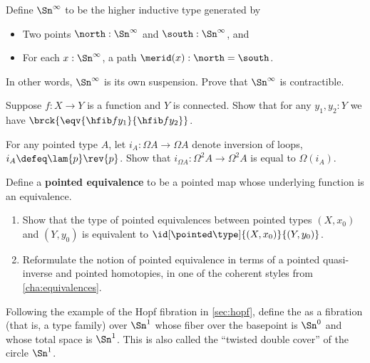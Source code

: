 {\begin{ex}\label{ex:contr-infinity-sphere-susp}
  Define $\Sn^\infty$ to be the higher inductive type generated by
  \begin{itemize}
  \item Two points $\north:\Sn^\infty$ and $\south:\Sn^\infty$, and
  \item For each $x:\Sn^\infty$, a path $\merid(x):\north=\south$.
  \end{itemize}
  In other words, $\Sn^\infty$ is its own suspension.
  Prove that $\Sn^\infty$ is contractible.
\end{ex}

\begin{ex}\label{ex:unique-fiber}
  Suppose $f:X\to Y$ is a function and $Y$ is connected.
  Show that for any $y_1,y_2:Y$ we have $\brck{\eqv{\hfib f {y_1}}{\hfib f {y_2}}}$.
\end{ex}

\begin{ex}\label{ex:ap-path-inversion}
  For any pointed type $A$, let $i_A : \Omega A \to \Omega A$ denote inversion of loops, $i_A \defeq \lam{p} \rev{p}$.
  Show that $i_{\Omega A} : \Omega^2 A \to \Omega^2 A$ is equal to $\Omega(i_A)$.
\end{ex}

\begin{ex}\label{ex:pointed-equivalences}
  Define a \textbf{pointed equivalence} to be a pointed map whose underlying function is an equivalence.
  \begin{enumerate}
  \item Show that the type of pointed equivalences between pointed types $(X,x_0)$ and $(Y,y_0)$ is equivalent to $\id[\pointed\type]{(X,x_0)}{(Y,y_0)}$.
  \item Reformulate the notion of pointed equivalence in terms of a pointed quasi-inverse and pointed homotopies, in one of the coherent styles from \cref{cha:equivalences}.
  \end{enumerate}
\end{ex}

\begin{ex}\label{ex:HopfJr}
  Following the example of the Hopf fibration in \cref{sec:hopf}, define the 
as a fibration (that is, a type family) over $\Sn ^1$ whose fiber over the basepoint is $\Sn ^0$ and whose total space is $\Sn ^1$.  This is also called the ``twisted double cover'' of the circle $\Sn ^1$.
\end{ex}

}

